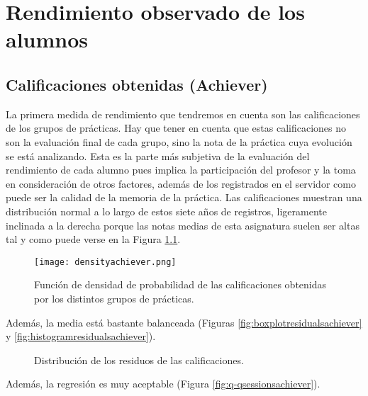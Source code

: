 \chapter{Rendimiento observado de los alumnos}

\section{Calificaciones obtenidas (Achiever)}

La primera medida de rendimiento que tendremos en cuenta son las calificaciones de los grupos de prácticas. Hay que tener en cuenta que estas calificaciones no son la evaluación final de cada grupo, sino la nota de la práctica cuya evolución se está analizando. Esta es la parte más subjetiva de la evaluación del rendimiento de cada alumno pues implica la participación del profesor y la toma en consideración de otros factores, además de los registrados en el servidor como puede ser la calidad de la memoria de la práctica. Las calificaciones muestran una distribución normal a lo largo de estos siete años de registros, ligeramente inclinada a la derecha porque las notas medias de esta asignatura suelen ser altas tal y como puede verse en la Figura \ref{fig:densityplotachiever}.

\begin{figure}[H]
    \centering
    \texttt{[image: densityachiever.png]}
    \caption{Función de densidad de probabilidad de las calificaciones obtenidas por los distintos grupos de prácticas.}
    \label{fig:densityplotachiever}
\end{figure}

Además, la media está bastante balanceada (Figuras \ref{fig:boxplotresidualsachiever} y \ref{fig:histogramresidualsachiever}).

\begin{figure}[H]
\centering
{}\qquad
{}
\caption{Distribución de los residuos de las calificaciones.}
\label{fig:achiever}
\end{figure}

Además, la regresión es muy aceptable (Figura \ref{fig:q-qsessionsachiever}).

